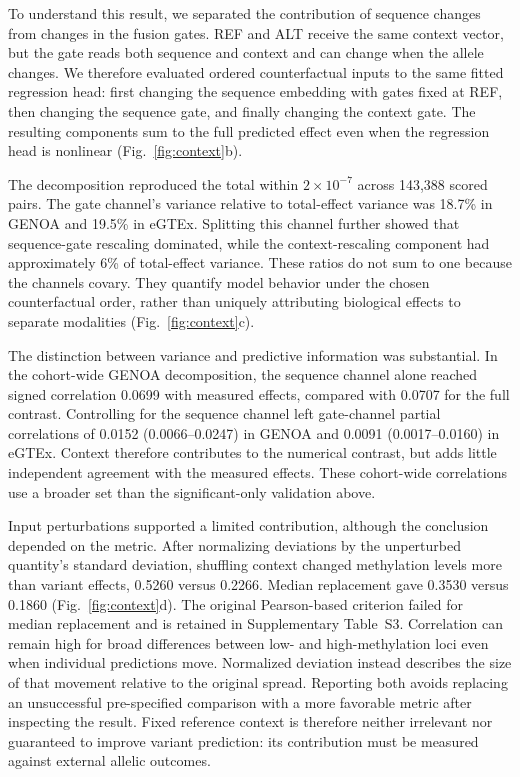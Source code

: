 \documentclass[11pt,letterpaper,twocolumn]{article}
\begin{document}
To understand this result, we separated the contribution of sequence changes from changes in the fusion gates. REF and ALT receive the same context vector, but the gate reads both sequence and context and can change when the allele changes. We therefore evaluated ordered counterfactual inputs to the same fitted regression head: first changing the sequence embedding with gates fixed at REF, then changing the sequence gate, and finally changing the context gate. The resulting components sum to the full predicted effect even when the regression head is nonlinear (Fig.~\ref{fig:context}b).

The decomposition reproduced the total within $2\times10^{-7}$ across 143,388 scored pairs. The gate channel's variance relative to total-effect variance was 18.7\% in GENOA and 19.5\% in eGTEx. Splitting this channel further showed that sequence-gate rescaling dominated, while the context-rescaling component had approximately 6\% of total-effect variance. These ratios do not sum to one because the channels covary. They quantify model behavior under the chosen counterfactual order, rather than uniquely attributing biological effects to separate modalities (Fig.~\ref{fig:context}c).

The distinction between variance and predictive information was substantial. In the cohort-wide GENOA decomposition, the sequence channel alone reached signed correlation 0.0699 with measured effects, compared with 0.0707 for the full contrast. Controlling for the sequence channel left gate-channel partial correlations of 0.0152 (0.0066--0.0247) in GENOA and 0.0091 (0.0017--0.0160) in eGTEx. Context therefore contributes to the numerical contrast, but adds little independent agreement with the measured effects. These cohort-wide correlations use a broader set than the significant-only validation above.

Input perturbations supported a limited contribution, although the conclusion depended on the metric. After normalizing deviations by the unperturbed quantity's standard deviation, shuffling context changed methylation levels more than variant effects, 0.5260 versus 0.2266. Median replacement gave 0.3530 versus 0.1860 (Fig.~\ref{fig:context}d). The original Pearson-based criterion failed for median replacement and is retained in Supplementary Table~S3. Correlation can remain high for broad differences between low- and high-methylation loci even when individual predictions move. Normalized deviation instead describes the size of that movement relative to the original spread. Reporting both avoids replacing an unsuccessful pre-specified comparison with a more favorable metric after inspecting the result. Fixed reference context is therefore neither irrelevant nor guaranteed to improve variant prediction: its contribution must be measured against external allelic outcomes.
\end{document}
